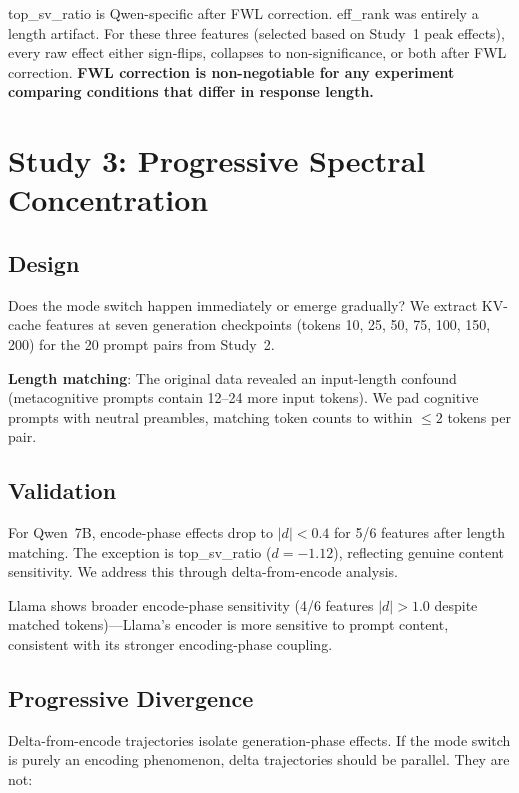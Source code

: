 \documentclass[11pt,a4paper]{article}
\begin{document}
top\_sv\_ratio is Qwen-specific after FWL correction. eff\_rank was
entirely a length artifact. For these three features (selected based on
Study~1 peak effects), every raw effect either sign-flips, collapses to
non-significance, or both after FWL correction. \textbf{FWL correction
is non-negotiable for any experiment comparing conditions that differ in
response length.}

\section{Study 3: Progressive Spectral Concentration}

\subsection{Design}

Does the mode switch happen immediately or emerge gradually? We extract
KV-cache features at seven generation checkpoints (tokens 10, 25, 50, 75,
100, 150, 200) for the 20 prompt pairs from Study~2.

\textbf{Length matching}: The original data revealed an input-length
confound (metacognitive prompts contain 12--24 more input tokens). We pad
cognitive prompts with neutral preambles, matching token counts to within
$\leq 2$ tokens per pair.

\subsection{Validation}

For Qwen~7B, encode-phase effects drop to $|d| < 0.4$ for 5/6 features
after length matching. The exception is top\_sv\_ratio ($d = -1.12$),
reflecting genuine content sensitivity. We address this through
delta-from-encode analysis.

Llama shows broader encode-phase sensitivity (4/6 features $|d| > 1.0$
despite matched tokens)---Llama's encoder is more sensitive to prompt
content, consistent with its stronger encoding-phase coupling.

\subsection{Progressive Divergence}

Delta-from-encode trajectories isolate generation-phase effects. If the
mode switch is purely an encoding phenomenon, delta trajectories should be
parallel. They are not:
\end{document}
